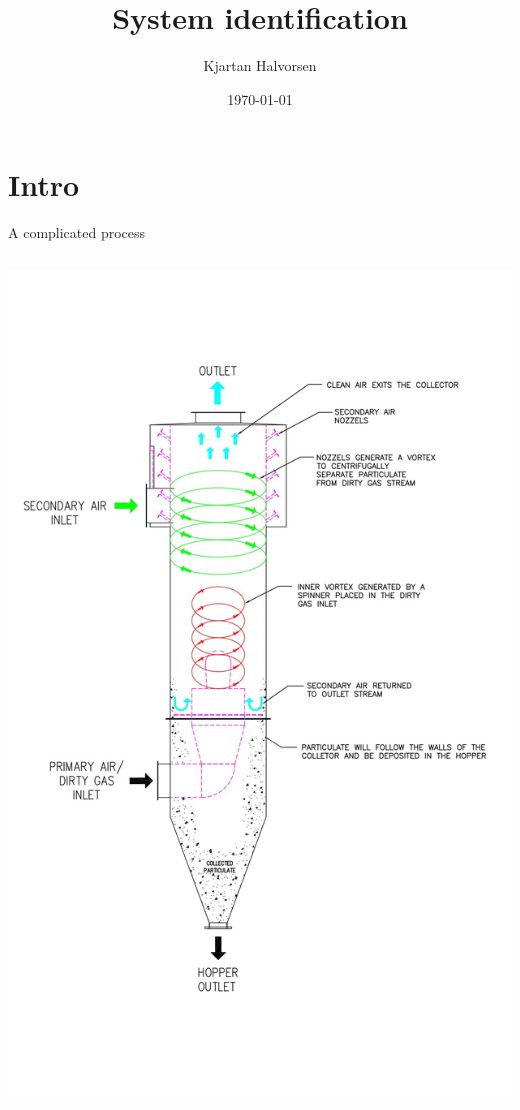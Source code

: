 \documentclass[presentation,aspectratio=169]{beamer}
\author{Kjartan Halvorsen}
\date{\today}
\title{System identification}
\begin{document}
\maketitle

\section{Intro}
\label{sec:org9403ba8}
\begin{frame}[label={sec:org1e78cfe}]{A complicated process}
\begin{columns}
\begin{column}{0.4\columnwidth}
\begin{center}
\includegraphics[height=0.7\textheight]{../../figures/Vertical-cyclone.jpg}
\end{center}


\end{column}
\end{columns}
\end{frame}
\end{document}
